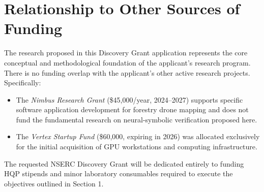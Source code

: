 \section{Relationship to Other Sources of Funding}
The research proposed in this Discovery Grant application represents the core conceptual and methodological foundation of the applicant's research program. There is no funding overlap with the applicant's other active research projects. Specifically:

\begin{itemize}[leftmargin=1.5em, itemsep=3pt]
  \item The \emph{Nimbus Research Grant} (\$45,000/year, 2024--2027) supports specific software application development for forestry drone mapping and does not fund the fundamental research on neural-symbolic verification proposed here.
  \item The \emph{Vertex Startup Fund} (\$60,000, expiring in 2026) was allocated exclusively for the initial acquisition of GPU workstations and computing infrastructure.
\end{itemize}

The requested NSERC Discovery Grant will be dedicated entirely to funding HQP stipends and minor laboratory consumables required to execute the objectives outlined in Section 1.
